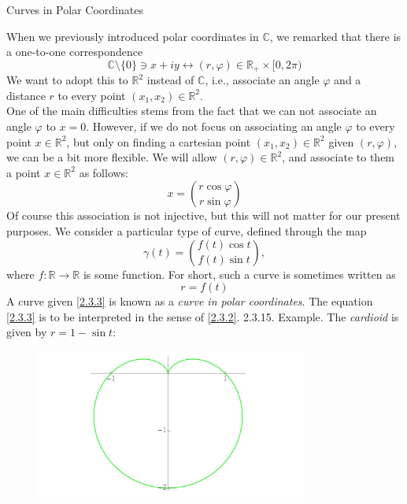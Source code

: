 \documentclass[smaller,hyperref={CJKbookmarks=true}]{beamer}
\newcommand{\C}{\mathbb{C}} \newcommand{\F}{\mathbb{F}} \newcommand{\R}{\mathbb{R}} \newcommand{\Q}{\mathbb{Q}}
\begin{document}
\begin{frame}{Curves in Polar Coordinates}
\begin{spacing}{1.05}
\vspace*{16pt}
When we previously introduced polar coordinates in $\C$, we remarked that
there is a one-to-one correspondence
\begin{equation*}
  \C\setminus\{0\}\ni x+iy\leftrightarrow(r,\varphi)\in\R_{+}\times[0,2\pi)
\end{equation*}
We want to adopt this to $\R^2$ instead of $\C$, i.e., associate an angle $\varphi$ and a distance $r$ to every point $(x_1,x_2)\in\R^2$.\\[5pt]
One of the main dif{}ficulties stems from the fact that we can not associate an angle $\varphi$ to $x=0$. However, if we do not focus on associating an angle $\varphi$ to every point $x\in\R^2$, but only on finding a cartesian point $(x_1,x_2)\in\R^2$ given $(r,\varphi)$, we can be a bit more flexible.
\newpage
We will allow $(r,\varphi)\in\R^2$, and associate to them a point $x\in\R^2$ as follows:
\[x=\binom{r\cos\varphi}{r\sin\varphi}\]
Of course this association is not injective, but this will not matter for our
present purposes. We consider a particular type of curve, defined through
the map
\begin{equation}\label{2.3.2}
  \gamma(t)=\binom{f(t)\cos t}{f(t)\sin t},
\end{equation}
where $f:\R\to\R$ is some function. For short, such a curve is sometimes written as
\begin{equation}\label{2.3.3}
  r=f(t)
\end{equation}
A curve given \eqref{2.3.3} is known as a \emph{curve in polar coordinates}. The equation \eqref{2.3.3} is to be interpreted in the sense of \eqref{2.3.2}.
\newpage
\alert{2.3.15. Example.} The \emph{cardioid} is given by $r=1-\sin t$:
\begin{figure}
  \centering
  \includegraphics[width=0.8\textwidth]{cardioid.jpg}

\end{figure}
\end{spacing}
\end{frame}
\end{document}
